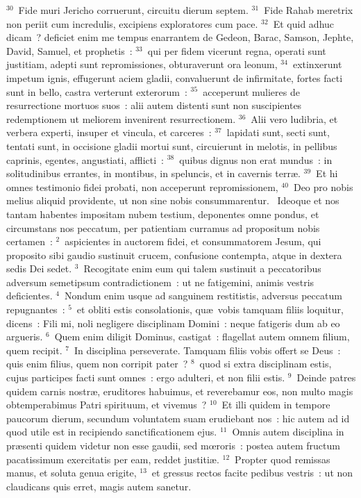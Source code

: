 ${}^{30}$~Fide muri Jericho corruerunt, circuitu dierum septem.
${}^{31}$~Fide Rahab meretrix non periit cum incredulis, excipiens exploratores cum pace.
${}^{32}$~Et quid adhuc dicam~? deficiet enim me tempus enarrantem de Gedeon, Barac, Samson, Jephte, David, Samuel, et prophetis~:
${}^{33}$~qui per fidem vicerunt regna, operati sunt justitiam, adepti sunt repromissiones, obturaverunt ora leonum,
${}^{34}$~extinxerunt impetum ignis, effugerunt aciem gladii, convaluerunt de infirmitate, fortes facti sunt in bello, castra verterunt exterorum~:
${}^{35}$~acceperunt mulieres de resurrectione mortuos suos~: alii autem distenti sunt non suscipientes redemptionem ut meliorem invenirent resurrectionem.
${}^{36}$~Alii vero ludibria, et verbera experti, insuper et vincula, et carceres~:
${}^{37}$~lapidati sunt, secti sunt, tentati sunt, in occisione gladii mortui sunt, circuierunt in melotis, in pellibus caprinis, egentes, angustiati, afflicti~:
${}^{38}$~quibus dignus non erat mundus~: in solitudinibus errantes, in montibus, in speluncis, et in cavernis terr\ae .
${}^{39}$~Et hi omnes testimonio fidei probati, non acceperunt repromissionem,
${}^{40}$~Deo pro nobis melius aliquid providente, ut non sine nobis consummarentur.
~Ideoque et nos tantam habentes impositam nubem testium, deponentes omne pondus, et circumstans nos peccatum, per patientiam curramus ad propositum nobis certamen~:
${}^{2}$~aspicientes in auctorem fidei, et consummatorem Jesum, qui proposito sibi gaudio sustinuit crucem, confusione contempta, atque in dextera sedis Dei sedet.
${}^{3}$~Recogitate enim eum qui talem sustinuit a peccatoribus adversum semetipsum contradictionem~: ut ne fatigemini, animis vestris deficientes.
${}^{4}$~Nondum enim usque ad sanguinem restitistis, adversus peccatum repugnantes~:
${}^{5}$~et obliti estis consolationis, qu\ae\ vobis tamquam filiis loquitur, dicens~: Fili mi, noli negligere disciplinam Domini~: neque fatigeris dum ab eo argueris.
${}^{6}$~Quem enim diligit Dominus, castigat~: flagellat autem omnem filium, quem recipit.
${}^{7}$~In disciplina perseverate. Tamquam filiis vobis offert se Deus~: quis enim filius, quem non corripit pater~?
${}^{8}$~quod si extra disciplinam estis, cujus participes facti sunt omnes~: ergo adulteri, et non filii estis.
${}^{9}$~Deinde patres quidem carnis nostr\ae , eruditores habuimus, et reverebamur eos, non multo magis obtemperabimus Patri spirituum, et vivemus~?
${}^{10}$~Et illi quidem in tempore paucorum dierum, secundum voluntatem suam erudiebant nos~: hic autem ad id quod utile est in recipiendo sanctificationem ejus.
${}^{11}$~Omnis autem disciplina in pr\ae senti quidem videtur non esse gaudii, sed mœroris~: postea autem fructum pacatissimum exercitatis per eam, reddet justiti\ae .
${}^{12}$~Propter quod remissas manus, et soluta genua erigite,
${}^{13}$~et gressus rectos facite pedibus vestris~: ut non claudicans quis erret, magis autem sanetur.


